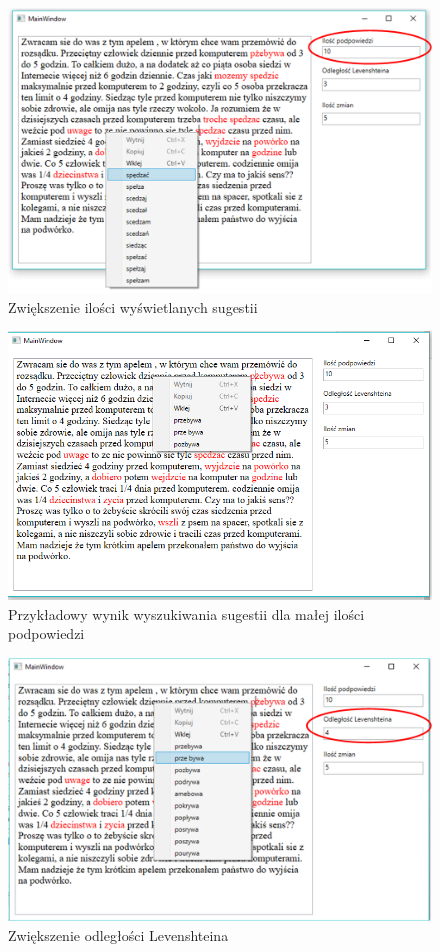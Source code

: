 \begin{figure} [H]
	\centering
	\includegraphics[width=1\linewidth]{rozdzial03/screen3_1.png}
	\caption{Zwiększenie ilości wyświetlanych sugestii}
	\label{fig:interfejs2}
\end{figure}

\begin{figure} [H]
	\centering
	\includegraphics[width=1\linewidth]{rozdzial03/screen4.png}
	\caption{Przykładowy wynik wyszukiwania sugestii dla małej ilości podpowiedzi}
	\label{fig:interfejs3}
\end{figure}

\begin{figure} [H]
	\centering
	\includegraphics[width=1\linewidth]{rozdzial03/screen5_1.png}
	\caption{Zwiększenie odległości Levenshteina}
	\label{fig:interfejs4}
\end{figure}

